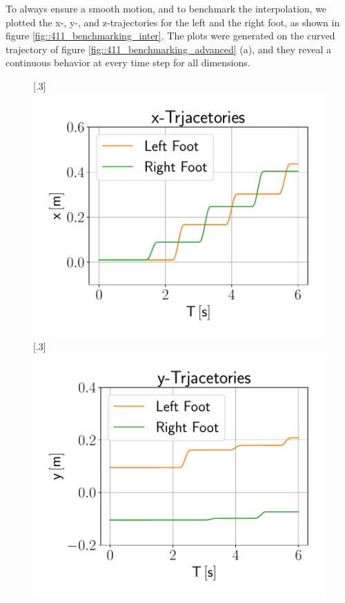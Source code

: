 To always ensure a smooth motion, and to benchmark the interpolation, we plotted the x-, y-, and z-trajectories for the left and the right foot, as shown in figure \ref{fig::411_benchmarking_inter}. The plots were generated on the curved trajectory of figure \ref{fig::411_benchmarking_advanced} (a), and they reveal a continuous behavior at every time step for all dimensions.
\begin{figure}[h!]
	\centering
	[.3\linewidth]{\includegraphics[scale=.3]{chapters/06_walking_experiments/01_user_controlled_walking/01_benchmarking/interpolated_x_trajectories.pdf}}
	[.3\linewidth]{\includegraphics[scale=.3]{chapters/06_walking_experiments/01_user_controlled_walking/01_benchmarking/interpolated_y_trajectories.pdf}}

\end{figure}
